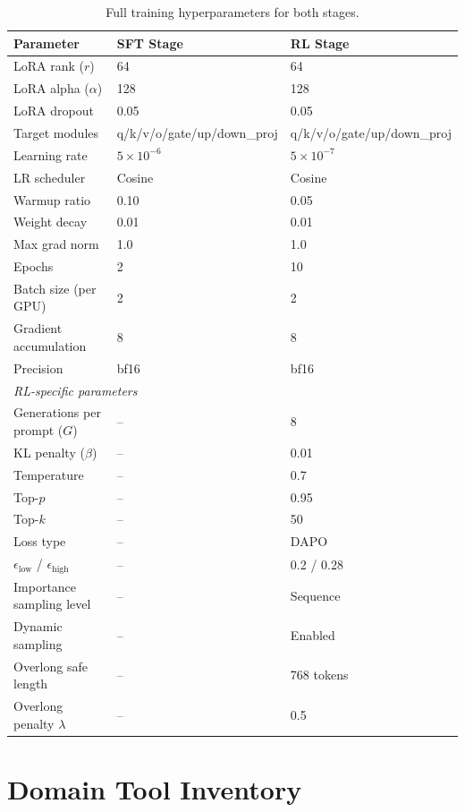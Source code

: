 \documentclass{article}
\begin{document}
\begin{table}[h]
\centering
\caption{Full training hyperparameters for both stages.}
\label{tab:hyperparams}
\begin{tabular}{lll}
\toprule
\textbf{Parameter} & \textbf{SFT Stage} & \textbf{RL Stage} \\
\midrule
LoRA rank ($r$) & 64 & 64 \\
LoRA alpha ($\alpha$) & 128 & 128 \\
LoRA dropout & 0.05 & 0.05 \\
Target modules & q/k/v/o/gate/up/down\_proj & q/k/v/o/gate/up/down\_proj \\
Learning rate & $5 \times 10^{-6}$ & $5 \times 10^{-7}$ \\
LR scheduler & Cosine & Cosine \\
Warmup ratio & 0.10 & 0.05 \\
Weight decay & 0.01 & 0.01 \\
Max grad norm & 1.0 & 1.0 \\
Epochs & 2 & 10 \\
Batch size (per GPU) & 2 & 2 \\
Gradient accumulation & 8 & 8 \\
Precision & bf16 & bf16 \\
\midrule
\multicolumn{3}{l}{\emph{RL-specific parameters}} \\
Generations per prompt ($G$) & -- & 8 \\
KL penalty ($\beta$) & -- & 0.01 \\
Temperature & -- & 0.7 \\
Top-$p$ & -- & 0.95 \\
Top-$k$ & -- & 50 \\
Loss type & -- & DAPO \\
$\epsilon_{\text{low}}$ / $\epsilon_{\text{high}}$ & -- & 0.2 / 0.28 \\
Importance sampling level & -- & Sequence \\
Dynamic sampling & -- & Enabled \\
Overlong safe length & -- & 768 tokens \\
Overlong penalty $\lambda$ & -- & 0.5 \\
\bottomrule
\end{tabular}
\end{table}

\section{Domain Tool Inventory}
\label{app:tools}
\end{document}
